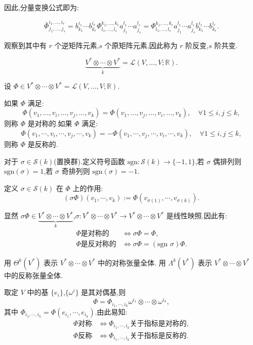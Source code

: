 因此,分量变换公式即为:

\[
\bar{\Phi}_{j_1, \ldots, j_s}^{i_1, \ldots, i_r} = b_{k_1}^{i_1} \cdots b_{k_r}^{i_r} \Phi_{l_1, \ldots, l_s}^{k_1, \ldots, k_r} a_{j_1}^{l_1} \cdots a_{j_s}^{l_s} = \Phi_{l_1, \ldots, l_s}^{k_1, \ldots, k_r} a_{j_1}^{l_1} \cdots a_{j_s}^{l_s} b_{k_1}^{i_1} \cdots b_{k_r}^{i_r}.
\]

观察到其中有 $r$ 个逆矩阵元素,$s$ 个原矩阵元素,因此称为 $r$ 阶反变,$s$ 阶共变.

\[
\underbrace{V^* \otimes \cdots \otimes V^*}_{k} = \mathcal{L}(V, \ldots, V; \mathbb{R}).
\]

\begin{definition}
设 $\Phi \in V^* \otimes \cdots \otimes V^* = \mathcal{L}(V, \ldots, V; \mathbb{R})$.

如果 $\Phi$ 满足:
\[
\Phi(v_1, \ldots, v_i, \ldots, v_j, \ldots, v_k) = \Phi(v_1, \ldots, v_j, \ldots, v_i, \ldots, v_k), \quad \forall 1 \leq i, j \leq k,
\]
则称 $\Phi$ 是对称的.如果 $\Phi$ 满足:
\[
\Phi(v_1, \cdots, v_i, \cdots, v_j, \cdots, v_k) = -\Phi(v_1, \cdots, v_j, \cdots, v_i, \cdots, v_k), \quad \forall 1 \leq i, j \leq k,
\]
则称 $\Phi$ 是反称的.
\end{definition}

对于 $\sigma \in \mathcal{S}(k)$(置换群).定义符号函数 $\text{sgn} : \mathcal{S}(k) \rightarrow \{-1, 1\}$,若 $\sigma$ 偶排列则 $\text{sgn}(\sigma) = 1$,若 $\sigma$ 奇排列则 $\text{sgn}(\sigma) = -1$.

定义 $\sigma \in \mathcal{S}(k)$ 在 $\Phi$ 上的作用:
\[
(\sigma \Phi)(v_1, \cdots, v_k) := \Phi(v_{\sigma(1)}, \cdots, v_{\sigma(k)}).
\]

显然 $\sigma \Phi \in \underbrace{V^* \otimes \cdots \otimes V^*}_{k}$,$\sigma : V^* \otimes \cdots \otimes V^* \rightarrow V^* \otimes \cdots \otimes V^*$ 是线性映照.因此有:
\begin{align*}
\Phi \text{是对称的} &\iff \sigma \Phi = \Phi, \\
\Phi \text{是反对称的} &\iff \sigma \Phi = (\text{sgn }\sigma) \Phi.
\end{align*}

用 $\Theta^k(V^*)$ 表示 $V^* \otimes \cdots \otimes V^*$ 中的对称张量全体.
用 $\Lambda^k(V^*)$ 表示 $V^* \otimes \cdots \otimes V^*$ 中的反称张量全体.

取定 $V$ 中的基 $\{e_i\}$,$\{\omega^i\}$ 是其对偶基,则
\[
\Phi = \Phi_{i_1,\cdots,i_k} \omega^{i_1} \otimes \cdots \otimes \omega^{i_k},
\]
其中 $\Phi_{i_1,\cdots,i_k} = \Phi(e_{i_1}, \cdots, e_{i_k})$.由此易知:
\begin{align*}
\Phi \text{对称} &\iff \Phi_{i_1,\cdots,i_k} \text{关于指标是对称的}, \\
\Phi \text{反称} &\iff \Phi_{i_1,\cdots,i_k} \text{关于指标是反称的}.
\end{align*}

